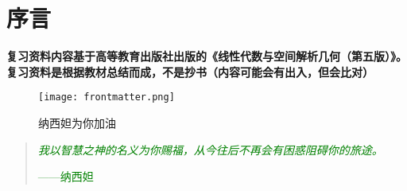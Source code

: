\maketitle
\chapter*{序言}
\begin{information}
	{\textbf{复习资料内容基于高等教育出版社出版的《线性代数与空间解析几何（第五版）》。复习资料是根据教材总结而成，不是抄书（内容可能会有出入，但会比对）}}
\end{information}
	\vspace*{15ex}
\begin{figure}[H]
	\centering
	\texttt{[image: frontmatter.png]}
	\caption*{纳西妲为你加油}
\end{figure}
\begin{quote}
	\textcolor{green}{\textit{我以智慧之神的名义为你赐福，从今往后不再会有困惑阻碍你的旅途。}}
	\begin{flushright}
			\textcolor{green}{——纳西妲}
	\end{flushright}
\end{quote}
\mytableofcontents